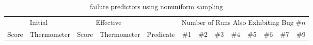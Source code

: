 
\begin{table*}
  \centering
  \caption{\moss failure predictors using nonuniform sampling}
  \label{tab:mossdilute}
  \tiny
  \begin{tabular}{lllllrrrrrrrr}
    \toprule
    \multicolumn{2}{c}{Initial} &
    \multicolumn{2}{c}{Effective} &
    &
    \multicolumn{8}{c}{Number of Runs Also Exhibiting Bug \#$n$} \\
    \cmidrule(lr){1-2}
    \cmidrule(lr){3-4}
    \cmidrule(lr){6-13}
    Score &
    Thermometer &
    Score &
    Thermometer &
    Predicate &
    \#1 & \#2 & \#3 & \#4 & \#5 & \#6 & \#7 & \#9 \\
    \midrule
    
    \bottomrule
  \end{tabular}
\end{table*}

